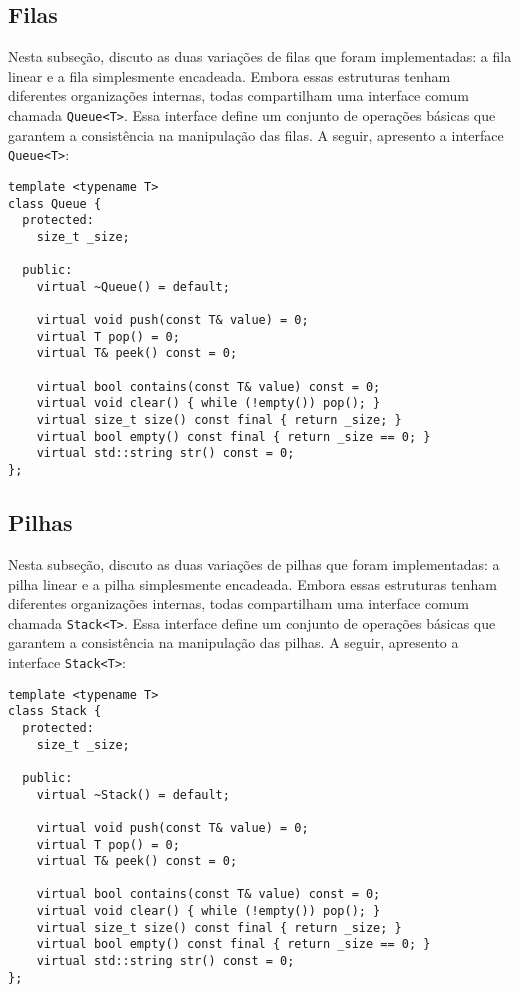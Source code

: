 \documentclass[12pt]{article}
\begin{document}
\newpage %

\subsection{Filas}

Nesta subseção, discuto as duas variações de filas que foram implementadas: a fila linear e a fila simplesmente encadeada. Embora essas estruturas tenham diferentes organizações internas, todas compartilham uma interface comum chamada \texttt{Queue<T>}. Essa interface define um conjunto de operações básicas que garantem a consistência na manipulação das filas. A seguir, apresento a interface \texttt{Queue<T>}:

\begin{verbatim}
template <typename T>
class Queue {
  protected:
	size_t _size;

  public:
	virtual ~Queue() = default;

	virtual void push(const T& value) = 0;
	virtual T pop() = 0;
	virtual T& peek() const = 0;

	virtual bool contains(const T& value) const = 0;
	virtual void clear() { while (!empty()) pop(); }
	virtual size_t size() const final { return _size; }
	virtual bool empty() const final { return _size == 0; }
	virtual std::string str() const = 0;
};
\end{verbatim}

\newpage %

\subsection{Pilhas}

Nesta subseção, discuto as duas variações de pilhas que foram implementadas: a pilha linear e a pilha simplesmente encadeada. Embora essas estruturas tenham diferentes organizações internas, todas compartilham uma interface comum chamada \texttt{Stack<T>}. Essa interface define um conjunto de operações básicas que garantem a consistência na manipulação das pilhas. A seguir, apresento a interface \texttt{Stack<T>}:

\begin{verbatim}
template <typename T>
class Stack {
  protected:
	size_t _size;

  public:
	virtual ~Stack() = default;

	virtual void push(const T& value) = 0;
	virtual T pop() = 0;
	virtual T& peek() const = 0;

	virtual bool contains(const T& value) const = 0;
	virtual void clear() { while (!empty()) pop(); }
	virtual size_t size() const final { return _size; }
	virtual bool empty() const final { return _size == 0; }
	virtual std::string str() const = 0;
};
\end{verbatim}
\end{document}
